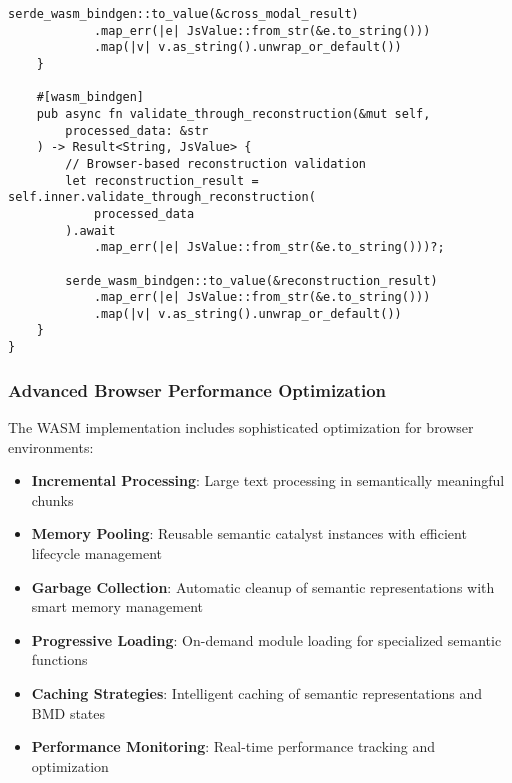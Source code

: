 \documentclass[12pt,a4paper,twoside]{article}
\begin{document}
\begin{lstlisting}[caption=Comprehensive WebAssembly Integration Architecture]
        serde_wasm_bindgen::to_value(&cross_modal_result)
            .map_err(|e| JsValue::from_str(&e.to_string()))
            .map(|v| v.as_string().unwrap_or_default())
    }

    #[wasm_bindgen]
    pub async fn validate_through_reconstruction(&mut self,
        processed_data: &str
    ) -> Result<String, JsValue> {
        // Browser-based reconstruction validation
        let reconstruction_result = self.inner.validate_through_reconstruction(
            processed_data
        ).await
            .map_err(|e| JsValue::from_str(&e.to_string()))?;

        serde_wasm_bindgen::to_value(&reconstruction_result)
            .map_err(|e| JsValue::from_str(&e.to_string()))
            .map(|v| v.as_string().unwrap_or_default())
    }
}
\end{lstlisting}

\subsubsection{Advanced Browser Performance Optimization}

The WASM implementation includes sophisticated optimization for browser environments:

\begin{itemize}
\item \textbf{Incremental Processing}: Large text processing in semantically meaningful chunks
\item \textbf{Memory Pooling}: Reusable semantic catalyst instances with efficient lifecycle management
\item \textbf{Garbage Collection}: Automatic cleanup of semantic representations with smart memory management
\item \textbf{Progressive Loading}: On-demand module loading for specialized semantic functions
\item \textbf{Caching Strategies}: Intelligent caching of semantic representations and BMD states
\item \textbf{Performance Monitoring}: Real-time performance tracking and optimization
\end{itemize}
\end{document}
